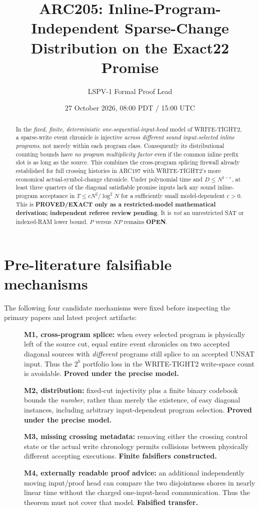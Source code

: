 \documentclass[11pt]{article}
\title{ARC205: Inline-Program-Independent Sparse-Change Distribution on the Exact22 Promise}
\author{LSPV-1 Formal Proof Lead}
\date{27 October 2026, 08:00 PDT / 15:00 UTC}
\newcommand{\OPEN}{\textbf{OPEN}}
\begin{document}
\maketitle

\begin{abstract}
In the \emph{fixed, finite, deterministic one-sequential-input-head} model of
WRITE-TIGHT2, a sparse-write event chronicle is injective \emph{across different
sound input-selected inline programs}, not merely within each program class.
Consequently its distributional counting bounds have \emph{no program
multiplicity factor} even if the common inline prefix slot is as long as the
source. This combines the cross-program splicing firewall already established
for full crossing histories in ARC197 with WRITE-TIGHT2's more economical
actual-symbol-change chronicle.  Under polynomial time and
$D\le N^{1-\varepsilon}$, at least three quarters of the diagonal satisfiable
promise inputs lack any sound inline-program acceptance in
$T\le cN^2/\log^2N$ for a sufficiently small model-dependent $c>0$.
This is \textbf{PROVED/EXACT only as a restricted-model mathematical
derivation; independent referee review pending}.  It is \emph{not} an
unrestricted SAT or indexed-RAM lower bound.  $P$ versus $NP$ remains
\OPEN.
\end{abstract}

\section{Pre-literature falsifiable mechanisms}
The following four candidate mechanisms were fixed before inspecting the
primary papers and latest project artifacts:
\begin{description}
\item[] \textbf{M1, cross-program splice:} when every selected program is
physically left of the source cut, equal entire event chronicles on two
accepted diagonal sources with \emph{different} programs still splice to
an accepted UNSAT input. Thus the $2^b$ portfolio loss in the WRITE-TIGHT2
write-space count is avoidable. \textbf{Proved under the precise model.}
\item[] \textbf{M2, distribution:} fixed-cut injectivity plus a finite
binary codebook bounds the \emph{number}, rather than merely the existence,
of easy diagonal instances, including arbitrary input-dependent program
selection. \textbf{Proved under the precise model.}
\item[] \textbf{M3, missing crossing metadata:} removing either the
crossing control state or the actual write chronology permits collisions
between physically different accepting executions. \textbf{Finite
falsifiers constructed.}
\item[] \textbf{M4, externally readable proof advice:} an additional
independently moving input/proof head can compare the two disjointness
shores in nearly linear time without the charged one-input-head
communication. Thus the theorem must not cover that model.
\textbf{Falsified transfer.}
\end{description}
\end{document}
